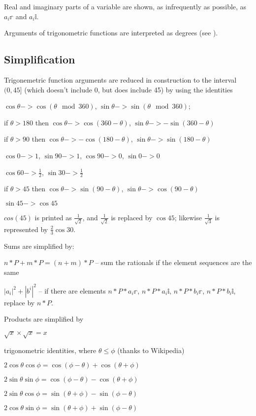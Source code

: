 Real and imaginary parts of a variable are shown, as infrequently as possible, as $a_{i}\mathbb{r}$ and $a_{i}\mathbb{i}$.

Arguments of trigonometric functions are interpreted as degrees (see ).

\subsection{Simplification}

Trigonemetric function arguments are reduced in construction to the interval $(0,45]$ (which doesn't include 0, but does include 45) by using the identities
\begin{itemize*}
\item $\cos\theta->\cos{(\theta\mod360)}$, $\sin\theta->\sin{(\theta\mod360)}$;
\item if $\theta>180$ then $\cos\theta-> \cos{(360-\theta)}$, $\sin\theta-> -\sin{(360-\theta)}$
\item if $\theta>90$ then $\cos\theta-> -\cos{(180-\theta)}$, $\sin\theta-> \sin{(180-\theta)}$
\item $\cos0->1$, $\sin90->1$, $\cos{90}->0$, $\sin0->0$
\item $\cos60->\frac{1}{2}$, $\sin30->\frac{1}{2}$
\item if $\theta>45$ then $\cos\theta->\sin{(90-\theta)}$, $\sin\theta->\cos{(90-\theta)}$
\item $\sin45->\cos45$
\end{itemize*}
 
$cos(45)$ is printed as $\frac{1}{\sqrt2}$, and $\frac{1}{\sqrt2}$ is replaced by $\cos{45}$; likewise $\frac{1}{\sqrt3}$ is represented by $\frac{2}{3}\cos{30}$.

Sums are simplified by:
\begin{itemize*}
\item $n*P+m*P=(n+m)*P$ -- sum the rationals if the element sequences are the same
\item $|a_{i}|^{2}+|b^{i}|^{2}$ -- if there are elements $n*P*a_{i}\mathbb{r}$, $n*P*a_{i}\mathbb{i}$, $n*P*b_{i}\mathbb{r}$, $n*P*b_{i}\mathbb{i}$, replace by $n*P$.
\end{itemize*}

Products are simplified by
\begin{itemize*}
\item $\sqrt{x}\times\sqrt{x}=x$
\item trigonometric identities, where $\theta\leq\phi$ (thanks to Wikipedia)
\begin{itemize*}
\item $2\cos\theta\cos\phi = \cos(\phi-\theta)+\cos(\theta+\phi)$
\item $2\sin\theta\sin\phi = \cos(\phi-\theta)-\cos(\theta+\phi)$
\item $2\sin\theta\cos\phi = \sin(\theta+\phi)-\sin(\phi-\theta)$
\item $2\cos\theta\sin\phi = \sin(\theta+\phi)+\sin(\phi-\theta)$
\end{itemize*}
\end{itemize*}

